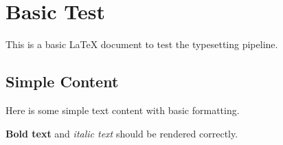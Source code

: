 \documentclass{article}
\begin{document}
\section{Basic Test}

This is a basic LaTeX document to test the typesetting pipeline.

\subsection{Simple Content}

Here is some simple text content with basic formatting.

\textbf{Bold text} and \textit{italic text} should be rendered correctly.
\end{document}
